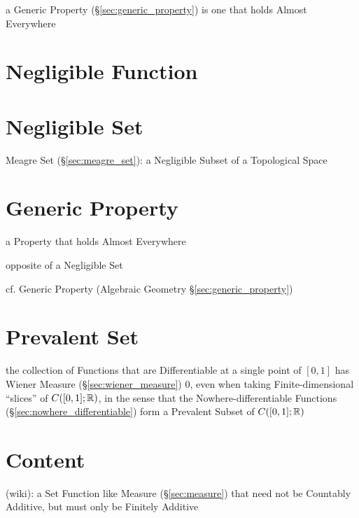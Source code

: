 a Generic Property (\S\ref{sec:generic_property}) is one that holds Almost
Everywhere



\section{Negligible Function}\label{sec:negligible_function}

\section{Negligible Set}\label{sec:negligible_set}

Meagre Set (\S\ref{sec:meagre_set}): a Negligible Subset of a Topological Space



\section{Generic Property}\label{sec:generic_measure_property}

a Property that holds Almost Everywhere

opposite of a Negligible Set

cf. Generic Property (Algebraic Geometry \S\ref{sec:generic_property})



\section{Prevalent Set}\label{sec:prevalent_set}

the collection of Functions that are Differentiable at a single point of
$[0,1]$ has Wiener Measure (\S\ref{sec:wiener_measure}) $0$, even when taking
Finite-dimensional ``slices'' of $C([0,1];\mathbb{R})$, in the sense that the
Nowhere-differentiable Functions (\S\ref{sec:nowhere_differentiable}) form a
Prevalent Subset of $C([0,1]; \mathbb{R})$



\section{Content}\label{sec:content}

(wiki): a Set Function like Measure (\S\ref{sec:measure}) that need not be
Countably Additive, but must only be Finitely Additive
